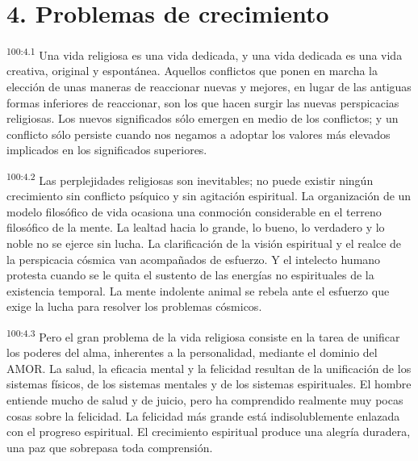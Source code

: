 \section*{4. Problemas de crecimiento}
\par
\textsuperscript{100:4.1} Una vida religiosa es una vida dedicada, y una vida dedicada es una vida creativa, original y espontánea. Aquellos conflictos que ponen en marcha la elección de unas maneras de reaccionar nuevas y mejores, en lugar de las antiguas formas inferiores de reaccionar, son los que hacen surgir las nuevas perspicacias religiosas. Los nuevos significados sólo emergen en medio de los conflictos; y un conflicto sólo persiste cuando nos negamos a adoptar los valores más elevados implicados en los significados superiores.

\par
\textsuperscript{100:4.2} Las perplejidades religiosas son inevitables; no puede existir ningún crecimiento sin conflicto psíquico y sin agitación espiritual. La organización de un modelo filosófico de vida ocasiona una conmoción considerable en el terreno filosófico de la mente. La lealtad hacia lo grande, lo bueno, lo verdadero y lo noble no se ejerce sin lucha. La clarificación de la visión espiritual y el realce de la perspicacia cósmica van acompañados de esfuerzo. Y el intelecto humano protesta cuando se le quita el sustento de las energías no espirituales de la existencia temporal. La mente indolente animal se rebela ante el esfuerzo que exige la lucha para resolver los problemas cósmicos.

\par
\textsuperscript{100:4.3} Pero el gran problema de la vida religiosa consiste en la tarea de unificar los poderes del alma, inherentes a la personalidad, mediante el dominio del AMOR. La salud, la eficacia mental y la felicidad resultan de la unificación de los sistemas físicos, de los sistemas mentales y de los sistemas espirituales. El hombre entiende mucho de salud y de juicio, pero ha comprendido realmente muy pocas cosas sobre la felicidad. La felicidad más grande está indisolublemente enlazada con el progreso espiritual. El crecimiento espiritual produce una alegría duradera, una paz que sobrepasa toda comprensión.

